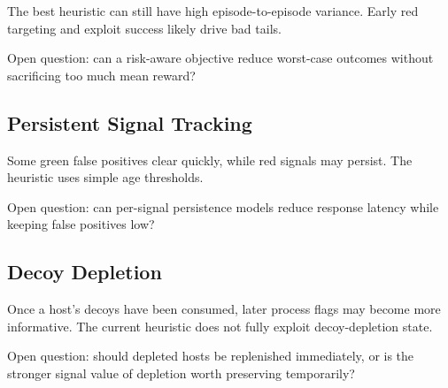 The best heuristic can still have high episode-to-episode variance. Early red targeting and exploit success likely drive bad tails.

Open question: can a risk-aware objective reduce worst-case outcomes without sacrificing too much mean reward?

\subsection{Persistent Signal Tracking}

Some green false positives clear quickly, while red signals may persist. The heuristic uses simple age thresholds.

Open question: can per-signal persistence models reduce response latency while keeping false positives low?

\subsection{Decoy Depletion}

Once a host's decoys have been consumed, later process flags may become more informative. The current heuristic does not fully exploit decoy-depletion state.

Open question: should depleted hosts be replenished immediately, or is the stronger signal value of depletion worth preserving temporarily?

